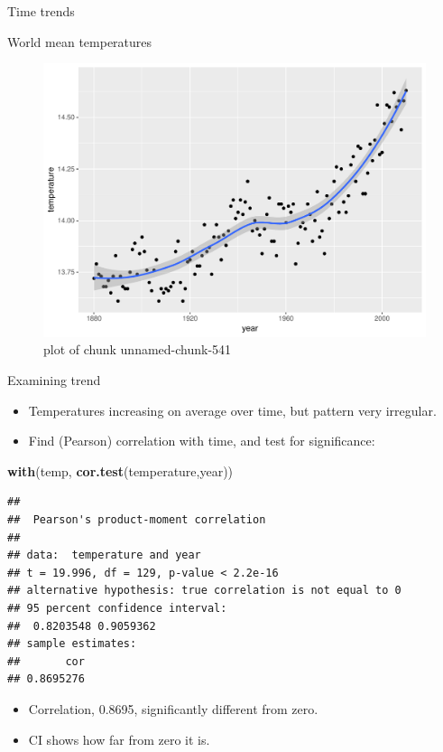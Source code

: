 \documentclass[ignorenonframetext,]{beamer}
\newenvironment{Shaded}{\begin{snugshade}}{\end{snugshade}}
\newcommand{\KeywordTok}[1]{\textcolor[rgb]{0.13,0.29,0.53}{\textbf{#1}}}
\newcommand{\NormalTok}[1]{#1}
\providecommand{\tightlist}{%
  \setlength{\itemsep}{0pt}\setlength{\parskip}{0pt}}
\begin{document}
\begin{frame}[fragile]{Time trends}
\begin{block}{World mean temperatures}
\begin{figure}
\centering
\includegraphics{figure/unnamed-chunk-541-1.pdf}
\caption{plot of chunk unnamed-chunk-541}
\end{figure}

Examining trend

\begin{itemize}
\tightlist
\item
  Temperatures increasing on average over time, but pattern very
  irregular.
\item
  Find (Pearson) correlation with time, and test for significance:
\end{itemize}

\begin{Shaded}
\begin{Highlighting}[]
\KeywordTok{with}\NormalTok{(temp, }\KeywordTok{cor.test}\NormalTok{(temperature,year))}
\end{Highlighting}
\end{Shaded}

\begin{verbatim}
## 
##  Pearson's product-moment correlation
## 
## data:  temperature and year
## t = 19.996, df = 129, p-value < 2.2e-16
## alternative hypothesis: true correlation is not equal to 0
## 95 percent confidence interval:
##  0.8203548 0.9059362
## sample estimates:
##       cor 
## 0.8695276
\end{verbatim}

\begin{itemize}
\tightlist
\item
  Correlation, 0.8695, significantly different from zero.
\item
  CI shows how far from zero it is.
\end{itemize}


\end{block}
\end{frame}
\end{document}

